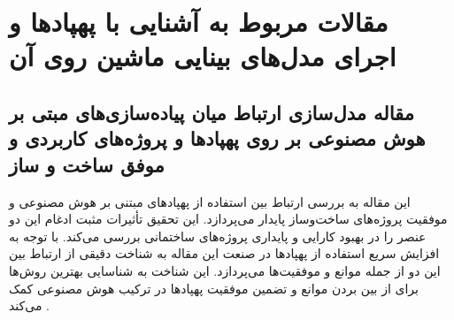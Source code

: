 \section{مقالات مربوط به آشنایی با پهپاد‌ها و اجرای مدل‌های بینایی ماشین روی آن}

\subsection[مقاله مدل‌سازی ارتباط میان پیاده‌سازی‌های مبتی بر هوش مصنوعی بر روی پهپاد‌ها و پروژه‌های کاربردی و موفق ساخت و ساز]{مقاله مدل‌سازی ارتباط میان پیاده‌سازی‌های مبتی بر هوش مصنوعی بر روی پهپاد‌ها و پروژه‌های کاربردی و موفق ساخت و ساز \protect{}}

این مقاله به بررسی ارتباط بین استفاده از پهپادهای مبتنی بر هوش مصنوعی و موفقیت پروژه‌های ساخت‌وساز پایدار می‌پردازد. این تحقیق تأثیرات مثبت ادغام
 این دو عنصر را در بهبود کارایی و پایداری پروژه‌های ساختمانی بررسی می‌کند. با توجه به افزایش سریع استفاده از پهپادها در صنعت این مقاله به شناخت دقیقی از ارتباط بین این دو از جمله موانع و موفقیت‌ها می‌پردازد. این شناخت به شناسایی بهترین روش‌ها برای از بین بردن موانع و تضمین موفقیت پهپادها در ترکیب هوش مصنوعی کمک می‌کند \cite{waqar2023modeling}.


